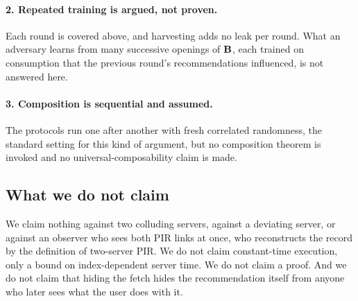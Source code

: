 \paragraph{2. Repeated training is argued, not proven.} Each round is covered
above, and harvesting adds no leak per round. What an adversary learns from many
successive openings of $\mathbf{B}$, each trained on consumption that the
previous round's recommendations influenced, is not answered here.

\paragraph{3. Composition is sequential and assumed.} The protocols run one after
another with fresh correlated randomness, the standard setting for this kind of
argument, but no composition theorem is invoked and no universal-composability
claim is made.

\subsection{What we do not claim}
\label{sec:threat:notclaimed}

We claim nothing against two colluding servers, against a deviating server, or
against an observer who sees both PIR links at once, who reconstructs the record
by the definition of two-server PIR. We do not claim constant-time execution,
only a bound on index-dependent server time. We do not claim a proof. And we do
not claim that hiding the fetch hides the recommendation itself from anyone who
later sees what the user does with it.
